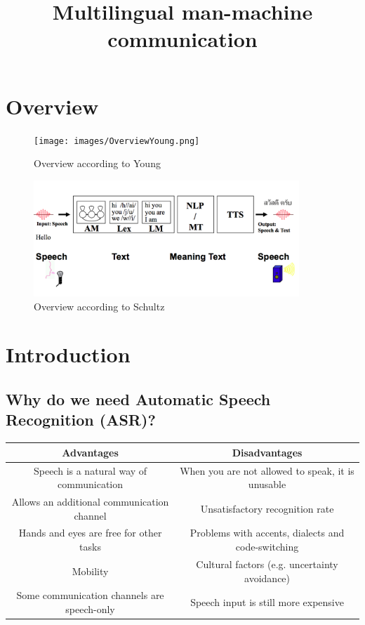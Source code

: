 \documentclass[11pt]{article}
\title{Multilingual man-machine communication}
\date{}
\begin{document}
\setlength{\parindent}{0cm}

\maketitle
\newpage

\tableofcontents
\newpage

\section{Overview}

\begin{figure}[ht]
\centering
\texttt{[image: images/OverviewYoung.png]}
\caption{Overview according to Young}
\label{fig:overviewYoung}
\end{figure}

\begin{figure}[ht]
\centering
\includegraphics[width=10cm]{images/OverviewSchultz.png}
\caption{Overview according to Schultz}
\label{fig:overviewSchultz}
\end{figure}

\newpage

\section{Introduction}

\subsection{Why do we need Automatic Speech Recognition (ASR)?}

\begin{center}
  \begin{tabular}{ c | c }
    \hline
    Advantages & Disadvantages  \\ \hline
    Speech is a natural way of communication & When you are not allowed to speak, it is unusable   \\
    Allows an additional communication channel   & Unsatisfactory recognition rate  \\
    Hands and eyes are free for other tasks & Problems with accents, dialects and code-switching   \\
    Mobility & Cultural factors (e.g. uncertainty avoidance)   \\
    Some communication channels are speech-only & Speech input is still more expensive   \\
    \hline
  \end{tabular}
\end{center}
\end{document}
